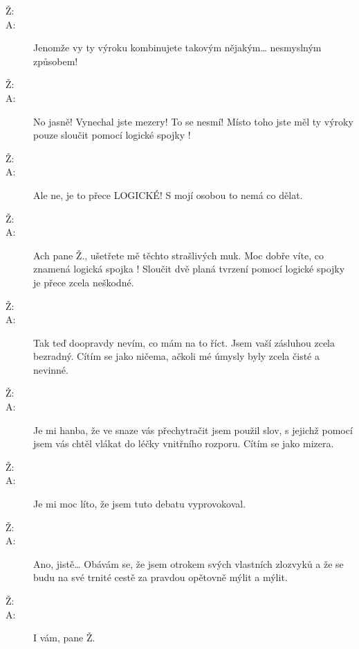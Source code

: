 \documentclass[12pt]{article}
\begin{document}
\begin{description}
\item[Ž:]

\item[A:] Jenomže vy ty výroku kombinujete takovým nějakým… nesmyslným způsobem!

\item[Ž:]

\item[A:] No jasně! Vynechal jste mezery! To se nesmí! Místo toho jste měl ty
    výroky pouze sloučit pomocí logické spojky !

\item[Ž:]

\item[A:] Ale ne, je to přece LOGICKÉ! S mojí osobou to nemá co dělat.

\item[Ž:]

\item[A:] Ach pane Ž., ušetřete mě těchto strašlivých muk. Moc dobře víte, co
    znamená logická spojka ! Sloučit dvě planá tvrzení pomocí logické spojky
     je přece zcela neškodné.

\item[Ž:] 

\item[A:] Tak teď doopravdy nevím, co mám na to říct. Jsem vaší zásluhou
    zcela bezradný. Cítím se jako ničema, ačkoli mé úmysly byly zcela čisté
    a nevinné.

\item[Ž:]

\item[A:] Je mi hanba, že ve snaze vás přechytračit jsem použil slov, s jejichž
    pomocí jsem vás chtěl vlákat do léčky vnitřního rozporu. Cítím se jako mizera.

\item[Ž:]

\item[A:] Je mi moc líto, že jsem tuto debatu vyprovokoval.

\item[Ž:]

\item[A:] Ano, jistě… Obávám se, že jsem otrokem svých vlastních zlozvyků a že
    se budu na své trnité cestě za pravdou opětovně mýlit a mýlit.

\item[Ž:]

\item[A:] I vám, pane Ž.
\end{description}
\end{document}
